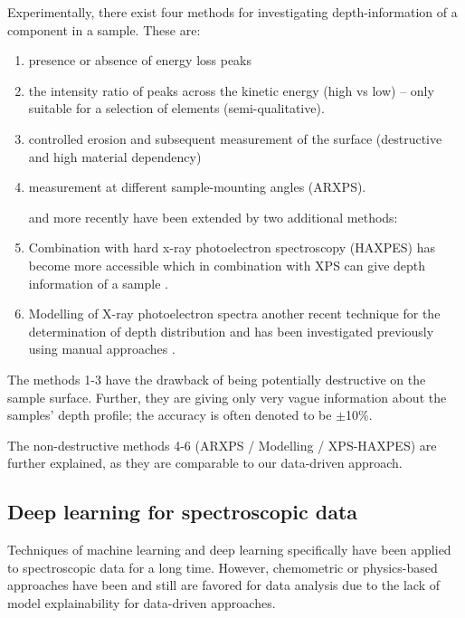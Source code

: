 Experimentally, there exist four methods for investigating depth-information of a component in a sample. These are:
\begin{enumerate}
    \item presence or absence of energy loss peaks
    \item the intensity ratio of peaks across the kinetic energy (high vs low) – only suitable for a selection of elements (semi-qualitative).
    \item controlled erosion and subsequent measurement of the surface (destructive and high material dependency)
    \item measurement at different sample-mounting angles (ARXPS). \cite{moulder_handbook_1992} 

and more recently have been extended by two additional methods:

    \item Combination with hard x-ray photoelectron spectroscopy (HAXPES) has become more accessible which in combination with XPS can give depth information of a sample \cite{zborowski_improved_2022}.
    \item Modelling of X-ray photoelectron spectra another recent technique for the determination of depth distribution and has been investigated previously using manual approaches \cite{zborowski_comparison_2022}.

\end{enumerate}


The methods 1-3 have the drawback of being potentially destructive on the sample surface. Further, they are giving only very vague information about the samples’ depth profile; the accuracy is often denoted to be $\pm$10\%.

The non-destructive methods 4-6 (ARXPS / Modelling / XPS-HAXPES) are further explained, as they are comparable to our data-driven approach. 

\subsection{Deep learning for spectroscopic data}
Techniques of machine learning and deep learning specifically have been applied to spectroscopic data for a long time. However, chemometric or physics-based approaches have been and still are favored for data analysis due to the lack of model explainability for data-driven approaches.






%
